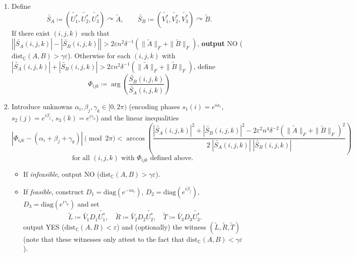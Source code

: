 \documentclass[11pt]{article}
\numberwithin{equation}{section}
\theoremstyle{remark}
\newcommand{\C}{\mathbb{C}}
\newcommand{\dist}{\mathrm{dist}}
\newcommand{\CC}{\mathbb{C}}
\begin{document}
\begin{algorithm}[H]
\begin{enumerate}[label=Step \arabic*]
\item\label{alg:HOSVDcore} Define
\[
\widetilde{S_A}\coloneqq \left(\widetilde{U_1^*}, \widetilde{U_2^*}, \widetilde{U_3^*}\right) \curvearrowright \widetilde{A},\qquad
\widetilde{S_B}\coloneqq\left( \widetilde{V_1^*}, \widetilde{V_2^*}, \widetilde{V_3^*}\right) \curvearrowright \widetilde{B}.
\]
If there exist $(i,j,k)$ such that $\left||\widetilde{S_A}(i,j,k)|-|\widetilde{S_B}(i,j,k)|\right|>2\varepsilon n^2\delta^{-1}(\|\widetilde{A}\|_F+\|\widetilde{B}\|_F)$, \textbf{output} \textsf{NO} ($\dist_{\CC}(A,B)>\gamma\varepsilon$).
Otherwise for each $(i,j,k)$ with $|\widetilde{S_A}(i,j,k)|+|\widetilde{S_B}(i,j,k)|> 2\varepsilon n^2\delta^{-1}(\|\widetilde{A}\|_F+\|\widetilde{B}\|_F)$, define
\[
\Phi_{ijk} \coloneqq \arg\left(\frac{\widetilde{S_B}(i,j,k)}{\widetilde{S_A}(i,j,k)}\right)
\]


\item\label{alg:feasibilityCheck} Introduce unknowns $\alpha_i,\beta_j,\gamma_k\in[0,2\pi)$ (encoding phases $s_1(i)=e^{i\alpha_i}$, $s_2(j)=e^{i\beta_j}$, $s_3(k)=e^{i\gamma_k}$) and the linear inequalities
\[
|\Phi_{ijk}-(\alpha_i+\beta_j+\gamma_k)|\pmod{2\pi} < \arccos\left(\frac{|\widetilde{S_A}(i,j,k)|^2+|\widetilde{S_B}(i,j,k)|^2-2\varepsilon^2 n^4\delta^{-2}(\|\widetilde{A}\|_F+\|\widetilde{B}\|_F)^2}{2\; |\widetilde{S_A}(i,j,k)|\;|\widetilde{S_B}(i,j,k)|}\right)\]\[\quad\text{for all }(i,j,k)\text{ with } \Phi_{ijk} \text{ defined above.}
\]

\begin{itemize}
\item If \emph{infeasible}, output \textsf{NO} ($\dist_\C(A,B) > \gamma\varepsilon$).
\item If \emph{feasible}, construct $D_1=\mathrm{diag}(e^{-i\alpha_i})$, $D_2=\mathrm{diag}(e^{i\beta_j})$, $D_3=\mathrm{diag}(e^{i\gamma_k})$ and set
\[
\widetilde{L}\coloneqq\widetilde{V_1}D_1\widetilde{U_1^*},\quad \widetilde{R}\coloneqq\widetilde{V_2}D_2\widetilde{U_2^*},\quad \widetilde{T}\coloneqq\widetilde{V_3}D_3\widetilde{U_3^*}.
\]
output \textsf{YES} ($\dist_\C(A,B) < \varepsilon$) and (optionally) the witness $(\widetilde{L},\widetilde{R},\widetilde{T})$ (note that these witnesses only attest to the fact that $\dist_\C(A,B) < \gamma\varepsilon$).
\end{itemize}
\end{enumerate}

\end{algorithm}
\end{document}
